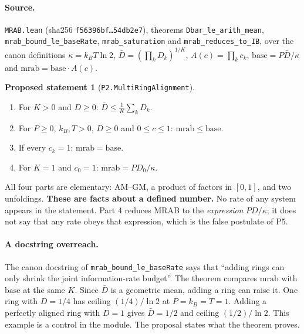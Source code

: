 \documentclass[11pt]{article}
\theoremstyle{definition}
\newtheorem{proposal}[theorem]{Proposed statement}
\theoremstyle{remark}
\begin{document}
\paragraph{Source.} \texttt{MRAB.lean} (sha256 \texttt{f56396bf\ldots 54db2e7}), theorems \texttt{Dbar\_le\_arith\_mean},
\texttt{mrab\_bound\_le\_baseRate}, \texttt{mrab\_saturation} and \texttt{mrab\_reduces\_to\_IB}, over the canon definitions
$\kappa=k_BT\ln2$, $\bar D=(\prod_k D_k)^{1/K}$, $A(c)=\prod_k c_k$, $\mathrm{base}=P\bar D/\kappa$ and
$\mathrm{mrab}=\mathrm{base}\cdot A(c)$.
\begin{proposal}[\texttt{P2.MultiRingAlignment}]
\begin{enumerate}
\item For $K>0$ and $D\ge0$: $\bar D\le\frac1K\sum_k D_k$.
\item For $P\ge0$, $k_B,T>0$, $D\ge0$ and $0\le c\le1$: $\mathrm{mrab}\le\mathrm{base}$.
\item If every $c_k=1$: $\mathrm{mrab}=\mathrm{base}$.
\item For $K=1$ and $c_0=1$: $\mathrm{mrab}=P D_0/\kappa$.
\end{enumerate}
\end{proposal}
All four parts are elementary: AM--GM, a product of factors in $[0,1]$, and two unfoldings.
\textbf{These are facts about a defined number.} No rate of any system appears in the statement. Part 4 reduces MRAB to the
\emph{expression} $PD/\kappa$; it does not say that any rate obeys that expression, which is the false postulate of P5.

\paragraph{A docstring overreach.} The canon docstring of \texttt{mrab\_bound\_le\_baseRate} says that ``adding rings can only
shrink the joint information-rate budget''. The theorem compares $\mathrm{mrab}$ with $\mathrm{base}$ at the same $K$. Since
$\bar D$ is a geometric mean, adding a ring can raise it. One ring with $D=1/4$ has ceiling $(1/4)/\ln2$ at $P=k_B=T=1$.
Adding a perfectly aligned ring with $D=1$ gives $\bar D=1/2$ and ceiling $(1/2)/\ln2$. This example is a control in the module.
The proposal states what the theorem proves.
\end{document}
